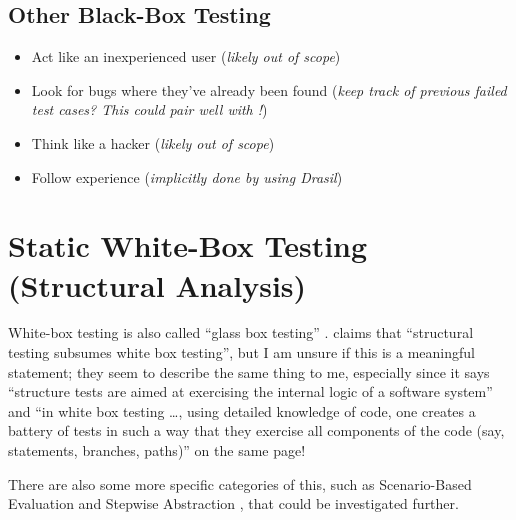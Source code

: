 \subsection[Other Black-Box Testing]{Other Black-Box Testing
      \citep[pp.~87-89]{Patton2006}}
\begin{itemize}
      \item Act like an inexperienced user (\emph{likely out of scope})
      \item Look for bugs where they've already been found (\emph{keep track of
                  previous failed test cases? This could pair well with
                  !})
      \item Think like a hacker (\emph{likely out of scope})
      \item Follow experience (\emph{implicitly done by using Drasil})
\end{itemize}

\section[Static White-Box Testing (Structural Analysis)]{Static White-Box
  Testing (Structural Analysis) \citep[pp.~91-104]{Patton2006}}

White-box testing is also called ``glass box testing''
\citep[p.~439]{PetersAndPedrycz2000}. \citep[p.~447]{PetersAndPedrycz2000} claims
that ``structural testing subsumes white box testing'', but I am unsure if this
is a meaningful statement; they seem to describe the same thing to me, 
especially since it says ``structure tests are aimed at exercising the internal
logic of a software system'' and ``in white box testing \dots, using detailed
knowledge of code, one creates a battery of tests in such a way that they
exercise all components of the code (say, statements, branches, paths)'' on the
same page!

There are also some more specific
categories of this, such as Scenario-Based
Evaluation \citep[pp.~417-418]{vanVliet2000} and Stepwise Abstraction
\citep[pp.~419-420]{vanVliet2000}, that could be investigated further.

